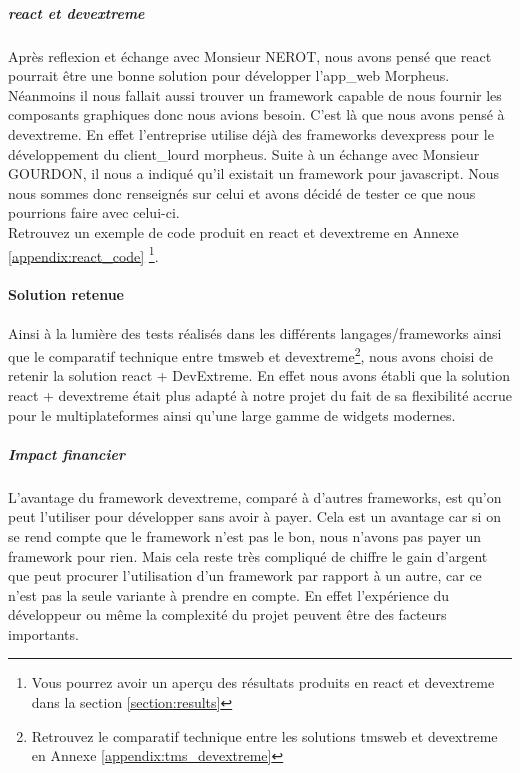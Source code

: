 \documentclass[a4paper, 12pt, french]{article}
\begin{document}
						\subparagraph{\gls{react} et \gls{devextreme}\\}
							Après reflexion et échange avec Monsieur NEROT, nous avons pensé que \gls{react} pourrait être une bonne solution pour développer l'\gls{app_web} Morpheus. Néanmoins il nous fallait aussi trouver un \gls{framework} capable de nous fournir les composants graphiques donc nous avions besoin. C'est là que nous avons pensé à \gls{devextreme}. En effet l'entreprise utilise déjà des \glspl{framework} \gls{devexpress} pour le développement du \gls{client_lourd} morpheus. Suite à un échange avec Monsieur GOURDON, il nous a indiqué qu'il existait un \gls{framework} pour \gls{javascript}. Nous nous sommes donc renseignés sur celui et avons décidé de tester ce que nous pourrions faire avec celui-ci.\\		
					
					\noindent Retrouvez un exemple de code produit en \gls{react} et \gls{devextreme} en Annexe \ref{appendix:react_code} \footnote{Vous pourrez avoir un aperçu des résultats produits en react et \gls{devextreme} dans la section \ref{section:results} }.
		
						\paragraph{Solution retenue\\}
							Ainsi à la lumière des tests réalisés dans les différents langages/\glspl{framework} ainsi que le comparatif technique entre \gls{tmsweb} et \gls{devextreme}\footnote{Retrouvez le comparatif technique entre les solutions \gls{tmsweb} et \gls{devextreme} en Annexe \ref{appendix:tms_devextreme} }, nous avons choisi de retenir la solution \gls{react} + DevExtreme. En effet nous avons établi que la solution \gls{react} + \gls{devextreme} était plus adapté à notre projet du fait de sa flexibilité accrue pour le multiplateformes ainsi qu'une large gamme de widgets modernes.

							\subparagraph{Impact financier\\}
								L'avantage du \gls{framework} \gls{devextreme}, comparé à d'autres \glspl{framework}, est qu'on peut l'utiliser pour développer sans avoir à payer. Cela est un avantage car si on se rend compte que le \gls{framework} n'est pas le bon, nous n'avons pas payer un \gls{framework} pour rien. Mais cela reste très compliqué de chiffre le gain d'argent que peut procurer l'utilisation d'un \gls{framework} par rapport à un autre, car ce n'est pas la seule variante à prendre en compte. En effet l'expérience du développeur ou même la complexité du projet peuvent être des facteurs importants.
				\newpage	
\end{document}
